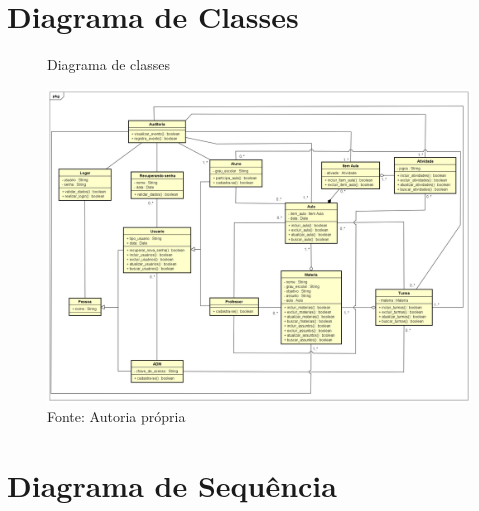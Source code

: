 \documentclass{utfpr-pg}
\begin{document}
\chapter{Diagrama de Classes}
    \label{chapter:diagrama de classes}
    \begin{figure}[H]
        \centering
        \captionsetup{width=0.9\textwidth}
        \caption{Diagrama de classes}
        \includegraphics[width=\linewidth]{fotos/Diagrama de classe.png}
        \caption*{Fonte: Autoria própria}
        \label{fig:Diagrama de Classes}
    \end{figure}

\chapter{Diagrama de Sequência}
    \label{chapter:diagrama de sequencia}
\end{document}
